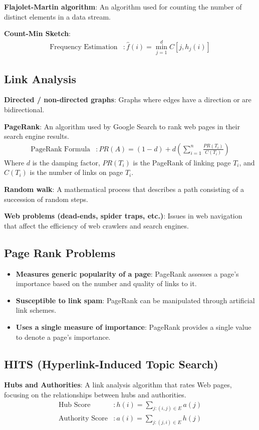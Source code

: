 \documentclass{article}
\begin{document}
\textbf{Flajolet-Martin algorithm}: An algorithm used for counting the number of distinct elements in a data stream.

\textbf{Count-Min Sketch}:
\begin{align*}
    \text{Frequency Estimation} &: \hat{f}(i) = \min_{j=1}^{d} C[j, h_j(i)]
\end{align*}

\subsection{Link Analysis}
\textbf{Directed / non-directed graphs}: Graphs where edges have a direction or are bidirectional.

\textbf{PageRank}: An algorithm used by Google Search to rank web pages in their search engine results.
\begin{align*}
    \text{PageRank Formula} &: PR(A) = (1-d) + d \left( \sum_{i=1}^{n} \frac{PR(T_i)}{C(T_i)} \right)
\end{align*}
Where \( d \) is the damping factor, \( PR(T_i) \) is the PageRank of linking page \( T_i \), and \( C(T_i) \) is the number of links on page \( T_i \).

\textbf{Random walk}: A mathematical process that describes a path consisting of a succession of random steps.

\textbf{Web problems (dead-ends, spider traps, etc.)}: Issues in web navigation that affect the efficiency of web crawlers and search engines.

\subsection{Page Rank Problems}
\begin{itemize}
    \item \textbf{Measures generic popularity of a page}: PageRank assesses a page's importance based on the number and quality of links to it.
    \item \textbf{Susceptible to link spam}: PageRank can be manipulated through artificial link schemes.
    \item \textbf{Uses a single measure of importance}: PageRank provides a single value to denote a page's importance.
\end{itemize}

\subsection{HITS (Hyperlink-Induced Topic Search)}
\textbf{Hubs and Authorities}: A link analysis algorithm that rates Web pages, focusing on the relationships between hubs and authorities.
\begin{align*}
    \text{Hub Score} &: h(i) = \sum_{j: (i,j) \in E} a(j) \\
    \text{Authority Score} &: a(i) = \sum_{j: (j,i) \in E} h(j)
\end{align*}
\end{document}
